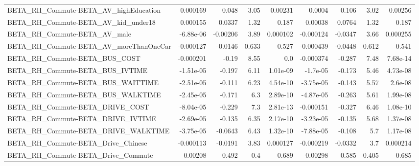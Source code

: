 \begin{tabular}{lrrrrrrrr}
BETA\_RH\_Commute-BETA\_AV\_highEducation              &    0.000169 &        0.048 &     3.05 &  0.00231 &     0.0004 &       0.106 &         3.02 &       0.00256 \\
BETA\_RH\_Commute-BETA\_AV\_kid\_under18                &    0.000155 &       0.0337 &     1.32 &    0.187 &    0.00038 &      0.0764 &         1.32 &         0.187 \\
BETA\_RH\_Commute-BETA\_AV\_male                       &   -6.88e-06 &     -0.00206 &     3.89 & 0.000102 &  -0.000124 &     -0.0347 &         3.66 &      0.000255 \\
BETA\_RH\_Commute-BETA\_AV\_moreThanOneCar             &   -0.000127 &      -0.0146 &    0.633 &    0.527 &  -0.000439 &     -0.0448 &        0.612 &         0.541 \\
BETA\_RH\_Commute-BETA\_BUS\_COST                      &   -0.000201 &        -0.19 &     8.55 &      0.0 &  -0.000374 &      -0.287 &         7.48 &      7.68e-14 \\
BETA\_RH\_Commute-BETA\_BUS\_IVTIME                    &   -1.51e-05 &       -0.197 &     6.11 & 1.01e-09 &   -1.7e-05 &      -0.173 &         5.46 &      4.73e-08 \\
BETA\_RH\_Commute-BETA\_BUS\_WAITTIME                  &   -2.51e-05 &       -0.111 &     6.23 & 4.54e-10 &  -3.75e-05 &      -0.143 &         5.57 &       2.6e-08 \\
BETA\_RH\_Commute-BETA\_BUS\_WALKTIME                  &   -2.45e-05 &       -0.171 &      6.3 & 2.89e-10 &  -4.87e-05 &      -0.263 &         5.61 &      1.99e-08 \\
BETA\_RH\_Commute-BETA\_DRIVE\_COST                    &   -8.04e-05 &       -0.229 &      7.3 & 2.81e-13 &  -0.000151 &      -0.327 &         6.46 &      1.08e-10 \\
BETA\_RH\_Commute-BETA\_DRIVE\_IVTIME                  &   -2.69e-05 &       -0.135 &     6.35 & 2.17e-10 &  -3.23e-05 &      -0.135 &         5.68 &      1.37e-08 \\
BETA\_RH\_Commute-BETA\_DRIVE\_WALKTIME                &   -3.75e-05 &      -0.0643 &     6.43 & 1.32e-10 &  -7.88e-05 &      -0.108 &          5.7 &      1.17e-08 \\
BETA\_RH\_Commute-BETA\_Drive\_Chinese                 &   -0.000113 &      -0.0191 &     3.83 & 0.000127 &  -0.000219 &     -0.0332 &          3.7 &      0.000214 \\
BETA\_RH\_Commute-BETA\_Drive\_Commute                 &     0.00208 &        0.492 &      0.4 &    0.689 &    0.00298 &       0.585 &        0.405 &         0.685 \\

\end{tabular}
